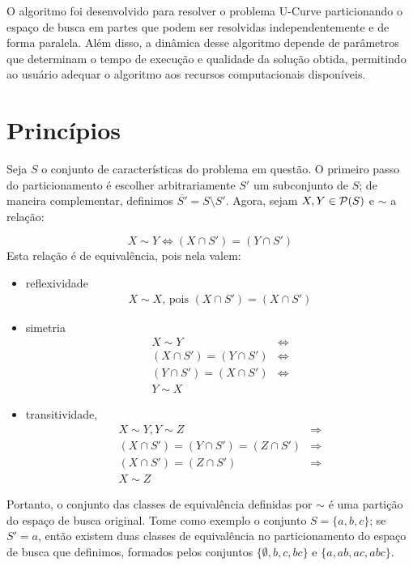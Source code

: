O algoritmo  foi desenvolvido 
para resolver o problema U-Curve particionando o espaço de busca em 
partes que podem ser resolvidas independentemente e de forma paralela. 
Além disso, a dinâmica desse algoritmo depende de parâmetros que 
determinam o tempo de execução e qualidade da solução obtida, permitindo
ao usuário adequar o algoritmo aos recursos computacionais disponíveis. 

\section{Princípios}\label{sec:pucs_principles}
Seja $S$ o conjunto de características do problema em questão. O 
primeiro passo do particionamento é escolher arbitrariamente $S'$ um 
subconjunto de $S$; de maneira complementar, definimos 
$\overline{S'} = S \setminus S'$. Agora, sejam $X, Y \in \mathcal{P} (S)$
e $\sim$ a relação:

\begin{equation*}
    X \sim Y \iff (X \cap S') = (Y \cap S')
\end{equation*}
Esta relação é de equivalência, pois nela valem:

\begin{itemize}
    \item{reflexividade}
        \begin{align*} 
            X \sim X \text{, pois }
            (X \cap S') = (X \cap S')
        \end{align*} 
    \item{simetria}
        \begin{align*}
            X \sim Y  & \iff \\
            (X \cap S') = (Y \cap S') & \iff \\
            (Y \cap S') = (X \cap S') & \iff \\
            Y \sim X 
        \end{align*}
    \item{transitividade,}
        \begin{align*}
            X \sim Y, Y \sim Z & \Rightarrow \\
            (X \cap S') = (Y \cap S') = (Z \cap S') & \Rightarrow \\
            (X \cap S') = (Z \cap S') & \Rightarrow \\
            X \sim Z
        \end{align*}
\end{itemize}
Portanto, o conjunto das classes de equivalência definidas por $\sim$ é
uma partição do espaço de busca original. Tome como exemplo o conjunto
$S = \{a, b, c\}$; se $S' = {a}$, então existem duas classes de 
equivalência no particionamento do espaço de busca que definimos, 
formados pelos conjuntos $\{\emptyset, b, c, bc\}$ e $\{a, ab, ac, 
abc\}$.

